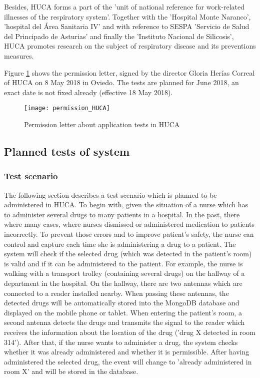Besides, HUCA forms a part of the 'unit of national reference for work-related illnesses of the respiratory system'. Together with the 'Hospital Monte Naranco', 'hospital del Área Sanitaria IV' and with reference to \ac{SESPA} 'Servicio de Salud del Principado de Asturias' and finally the 'Instituto Nacional de Silicosis', HUCA promotes research on the subject of respiratory disease and its preventions measures.

Figure \ref{fig:permission} shows the permission letter, signed by the director Gloria Herías Correal of HUCA on 8 May 2018 in Oviedo.
The tests are planned for June 2018, an exact date is not fixed already (effective 18 May 2018). 

\begin{figure}
\centering
\texttt{[image: permission\_HUCA]} 
\caption{\label{fig:permission}Permission letter about application tests in HUCA} 
\end{figure}

\subsection{Planned tests of system}

\subsubsection{Test scenario}

The following section describes a test scenario which is planned to be administered in HUCA. 
To begin with, given the situation of a nurse which has to administer several drugs to many patients in a hospital. In the past, there where many cases, where nurses dismissed or administered medication to patients incorrectly. To prevent those errors and to improve patient's safety, the nurse can control and capture each time she is administering a drug to a patient. The system will check if the selected drug (which was detected in the patient's room) is valid and if it can be administered to the patient. For example, the nurse is walking with a transport trolley (containing several drugs) on the hallway of a department in the hospital. On the hallway, there are two antennas which are connected to a reader installed nearby. When passing these antennas, the detected drugs will be automatically stored into the MongoDB database and displayed on the mobile phone or tablet. 
When entering the patient's room, a second antenna detects the drugs and transmits the signal to the reader which receives the information about the location of the drug ('drug X detected in room 314'). After that, if the nurse wants to administer a drug, the system checks whether it was already administered and whether it is permissible. After having administered the selected drug, the event will change to 'already administered in room X' and will be stored in the database. 


